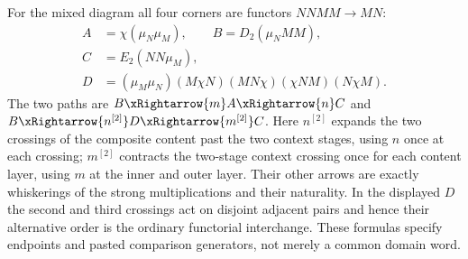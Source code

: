 \documentclass[11pt]{article}
\begin{document}
For the mixed diagram all four corners are functors $NNMM\to MN$:
\[
 \begin{split}
 A&=\chi(\mu_N\mu_M),\qquad
 B=D_2(\mu_N MM),\\
 C&=E_2(NN\mu_M),\\
 D&=(\mu_M\mu_N)(M\chi N)(MN\chi)(\chi NM)(N\chi M).
 \end{split}
\]
The two paths are $B\xRightarrow{m}A\xRightarrow{n}C$ and
$B\xRightarrow{n^{[2]}}D\xRightarrow{m^{[2]}}C$. Here $n^{[2]}$ expands the two crossings of the composite content past the two context stages, using $n$ once at each crossing; $m^{[2]}$ contracts the two-stage context crossing once for each content layer, using $m$ at the inner and outer layer. Their other arrows are exactly whiskerings of the strong multiplications and their naturality. In the displayed $D$ the second and third crossings act on disjoint adjacent pairs and hence their alternative order is the ordinary functorial interchange. These formulas specify endpoints and pasted comparison generators, not merely a common domain word.
\end{document}

